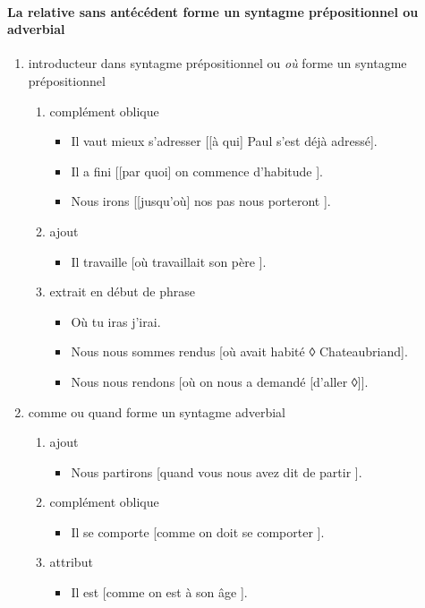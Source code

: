 \documentclass[UTF8]{report}
\begin{document}
\paragraph{La relative sans antécédent forme un syntagme prépositionnel ou adverbial}
\begin{enumerate}
    \item introducteur dans syntagme prépositionnel ou \textit{où} forme un syntagme prépositionnel
    \begin{enumerate}
        \item complément oblique
        \begin{itemize}
            \item Il vaut mieux s’adresser [[à qui] Paul s’est déjà adressé].
            \item Il a fini [[par quoi] on commence d’habitude ].
            \item Nous irons [[jusqu’où] nos pas nous porteront ].
        \end{itemize}
        \item ajout 
        \begin{itemize}
            \item Il travaille [où travaillait son père ].
        \end{itemize}
        \item extrait en début de phrase
        \begin{itemize}
            \item Où tu iras j’irai.
            \item Nous nous sommes rendus [où avait habité ◊ Chateaubriand].
            \item Nous nous rendons [où on nous a demandé [d’aller ◊]].
        \end{itemize}
    \end{enumerate}
    \item comme ou quand forme un syntagme adverbial
    \begin{enumerate}
        \item ajout
        \begin{itemize}
            \item Nous partirons [quand vous nous avez dit de partir ].
        \end{itemize}
        \item complément oblique
        \begin{itemize}
            \item Il se comporte [comme on doit se comporter ].
        \end{itemize}
        \item attribut
        \begin{itemize}
            \item Il est [comme on est à son âge ].
        \end{itemize}
    \end{enumerate}
\end{enumerate}
\end{document}
